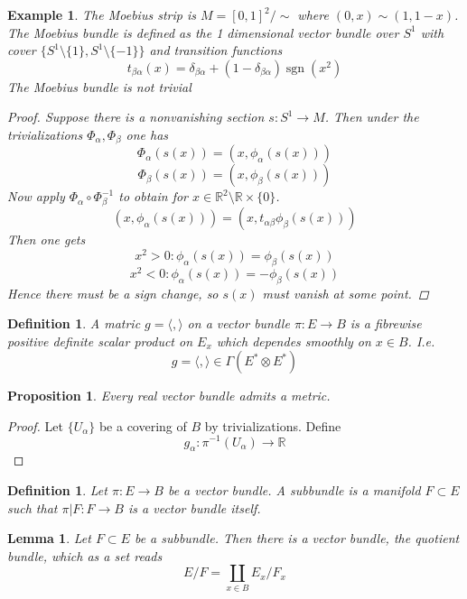 \documentclass{article}
\numberwithin{theorem}{section}
\newtheorem{lemma}[theorem]{Lemma}
\newtheorem{proposition}[theorem]{Proposition}
\newtheorem{definition}[theorem]{Definition}
\newtheorem*{example}{Example}
\newcommand{\R}{\mathbb{R}}
\newcommand{\1}{\mathds{1}}
\DeclareMathOperator{\sgn}{sgn}
\begin{document}
\begin{example}
    The Moebius strip is $M = [0,1]^2 / \sim$ where $(0,x) \sim (1, 1-x)$. The Moebius bundle is defined as the 1 dimensional vector bundle over $S^1$ with cover $\{S^1 \setminus \{ 1 \}, S^1 \setminus \{ -1 \} \} $ and transition functions 
    \[ t_{\beta \alpha}(x) = \delta_{\beta \alpha} + (1-\delta_{\beta \alpha})\sgn(x^2)  \]
    The Moebius bundle is not trivial  
    \begin{proof}
        Suppose there is a nonvanishing section $s: S^1 \to M$. Then under the trivializations $\Phi_\alpha, \Phi_\beta$ one has 
        \[ \Phi_\alpha(s(x)) = (x, \phi_\alpha(s(x)))\]
        \[ \Phi_\beta(s(x)) = (x, \phi_\beta(s(x)))\] 
        Now apply $\Phi_\alpha\circ \Phi_\beta^{-1}$ to obtain for $ x \in \R^2 \setminus  \R \times \{0 \}  $. 
        \[ (x, \phi_\alpha(s(x))) = (x, t_{\alpha \beta} \phi_\beta(s(x)))\]
        Then one gets 
        \[ x^2 > 0 : \phi_\alpha(s(x)) = \phi_\beta(s(x))\]
        \[ x^2 < 0: \phi_\alpha(s(x)) = -\phi_\beta(s(x)) \] 
        Hence there must be a sign change, so $s(x)$ must vanish at some point. 
    \end{proof}
\end{example}

\begin{definition}
    A matric $g = \langle , \rangle $ on a vector bundle $\pi: E \to B$ is a fibrewise positive definite scalar product on $E_x$ which dependes smoothly on $x \in B$. I.e. 
    \[ g = \langle , \rangle \in \Gamma( E^* \otimes E^* )\]
\end{definition}

\begin{proposition}
    Every real vector bundle admits a metric. 
\end{proposition}
\begin{proof}
    Let $\{ U_\alpha \} $ be a covering of $B$ by trivializations. Define 
    \[ g_\alpha : \pi^{-1}(U_\alpha) \to \R \]
    \[ \]
\end{proof}

\begin{definition}
    Let $\pi: E \to B$ be a vector bundle. 
     A subbundle is a manifold $F \subset E$ such that $\pi|F: F \to B$ is a vector bundle itself. 
\end{definition}

\begin{lemma}
    Let $F \subset E$ be a subbundle. Then there is a vector bundle, the quotient bundle, which as a set reads 
    \[ E/F = \coprod_{x \in B} E_x / F_x  \] 
\end{lemma}
\end{document}
